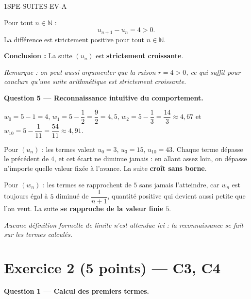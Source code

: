\begin{corrige}{1SPE-SUITES-EV-A}

Pour tout $n \in \mathbb{N}$ :
\[
  u_{n+1} - u_n = 4 > 0.
\]
La différence est strictement positive pour tout $n \in \mathbb{N}$.

\textbf{Conclusion :} La suite $(u_n)$ est \textbf{strictement croissante}.

\textit{Remarque : on peut aussi argumenter que la raison $r = 4 > 0$, ce qui suffit pour conclure qu'une suite arithmétique est strictement croissante.}


\medskip
\textbf{Question 5 — Reconnaissance intuitive du comportement.}

$w_0 = 5 - 1 = 4$, $w_1 = 5 - \dfrac{1}{2} = \dfrac{9}{2} = 4{,}5$, $w_2 = 5 - \dfrac{1}{3} = \dfrac{14}{3} \approx 4{,}67$ et $w_{10} = 5 - \dfrac{1}{11} = \dfrac{54}{11} \approx 4{,}91$.

Pour $(u_n)$ : les termes valent $u_0 = 3$, $u_3 = 15$, $u_{10} = 43$. Chaque terme dépasse le précédent de $4$, et cet écart ne diminue jamais : en allant assez loin, on dépasse n'importe quelle valeur fixée à l'avance. La suite \textbf{croît sans borne}.

Pour $(w_n)$ : les termes se rapprochent de $5$ sans jamais l'atteindre, car $w_n$ est toujours égal à $5$ diminué de $\dfrac{1}{n+1}$, quantité positive qui devient aussi petite que l'on veut. La suite \textbf{se rapproche de la valeur finie } $5$.


\textit{Aucune définition formelle de limite n'est attendue ici : la reconnaissance se fait sur les termes calculés.}

\section*{Exercice 2 \hfill (5 points) — C3, C4}


\bigskip
\textbf{Question 1 — Calcul des premiers termes.}


\end{corrige}
